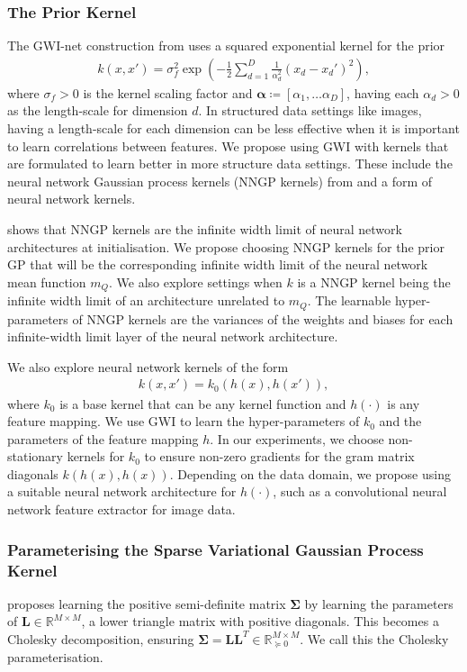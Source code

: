 \documentclass{article}
\numberwithin{equation}{section}
\begin{document}
\subsubsection{The Prior Kernel}
The GWI-net construction from \cite{wild2022generalized} uses a squared exponential kernel for the prior
\begin{align}
    k(x, x') = \sigma^2_f \exp\left(-\frac{1}{2} \sum_{d=1}^D \frac{1}{\alpha_d^2}(x_d-x_d')^2\right),
\end{align}
where $\sigma_f > 0$ is the kernel scaling factor and $\boldsymbol{\alpha} \coloneqq [\alpha_1, \dots \alpha_D]$, having each $\alpha_d >0$ as the length-scale for dimension $d$. 
In structured data settings like images, having a length-scale for each dimension can be less effective when it is important to learn correlations between features.
We propose using GWI with kernels that are formulated to learn better in more structure data settings. These include the neural network Gaussian process kernels (NNGP kernels) from \cite{novak2019neural} and a form of neural network kernels.

\cite{novak2019neural} shows that NNGP kernels are the infinite width limit of neural network architectures at initialisation. 
We propose choosing NNGP kernels for the prior GP that will be the corresponding infinite width limit of the neural network mean function $m_Q$. 
We also explore settings when $k$ is a NNGP kernel being the infinite width limit of an architecture unrelated to $m_Q$.
The learnable hyper-parameters of NNGP kernels are the variances of the weights and biases for each infinite-width limit layer of the neural network architecture.

We also explore neural network kernels of the form 
\begin{align}
    k(x, x') = k_0(h(x), h(x')),
\end{align}
where $k_0$ is a base kernel that can be any kernel function and $h(\cdot)$ is any feature mapping. We use GWI to learn the hyper-parameters of $k_0$ and the parameters of the  feature mapping $h$. In our experiments, we choose non-stationary kernels for $k_0$ to ensure non-zero gradients for the gram matrix diagonals $k(h(x), h(x))$. Depending on the data domain, we propose using a suitable neural network architecture for $h(\cdot)$, such as a convolutional neural network feature extractor for image data.



\subsubsection{Parameterising the Sparse Variational Gaussian Process Kernel}
\cite{wild2022generalized} proposes learning the positive semi-definite matrix $\mathbf{\Sigma}$ by learning the parameters of $\mathbf{L} \in \mathbb{R}^{M \times M}$, a lower triangle matrix with positive diagonals. This becomes a Cholesky decomposition, ensuring $\mathbf{\Sigma} = \mathbf{L}\mathbf{L}^T \in \mathbb{R}^{M \times M}_{\succcurlyeq 0}$. We call this the Cholesky parameterisation. 
\end{document}
